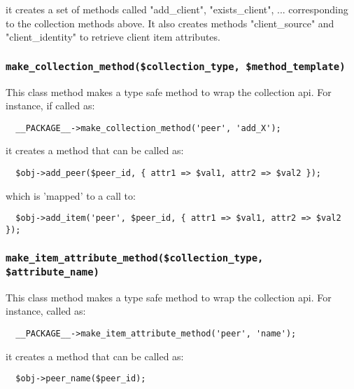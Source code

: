 \documentclass[12pt,a4paper]{article}
\begin{document}
it creates a set of methods called "add\_client", "exists\_client", ...
corresponding to the collection methods above.  It also creates methods
"client\_source" and "client\_identity" to retrieve client item attributes.

\subsubsection*{\texttt{make\_collection\_method(\$collection\_type, \$method\_template)}\label{xPL::Base_make_collection_method_collection_type_method_template_}}


This class method makes a type safe method to wrap the collection api.
For instance, if called as:

\begin{verbatim}
  __PACKAGE__->make_collection_method('peer', 'add_X');
\end{verbatim}


it creates a method that can be called as:

\begin{verbatim}
  $obj->add_peer($peer_id, { attr1 => $val1, attr2 => $val2 });
\end{verbatim}


which is 'mapped' to a call to:

\begin{verbatim}
  $obj->add_item('peer', $peer_id, { attr1 => $val1, attr2 => $val2 });
\end{verbatim}
\subsubsection*{\texttt{make\_item\_attribute\_method(\$collection\_type, \$attribute\_name)}\label{xPL::Base_make_item_attribute_method_collection_type_attribute_name_}}


This class method makes a type safe method to wrap the collection api.
For instance, called as:

\begin{verbatim}
  __PACKAGE__->make_item_attribute_method('peer', 'name');
\end{verbatim}


it creates a method that can be called as:

\begin{verbatim}
  $obj->peer_name($peer_id);
\end{verbatim}
\end{document}
